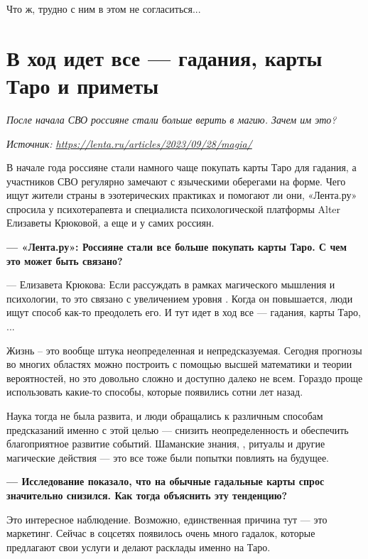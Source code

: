Что ж, трудно с ним в этом не согласиться...

\newpage
\section{В ход идет все — гадания, карты Таро и приметы}

\textit{После начала СВО россияне стали больше верить в магию. Зачем им это?}

\textit{Источник: \url{https://lenta.ru/articles/2023/09/28/magia/}}

В начале года россияне стали намного чаще покупать карты Таро для гадания, а участников СВО регулярно замечают с языческими оберегами на форме. Чего ищут жители страны в эзотерических практиках и помогают ли они, «Лента.ру» спросила у психотерапевта и специалиста психологической платформы Alter Елизаветы Крюковой, а еще и у самих россиян.

\textbf{--- «Лента.ру»: Россияне стали все больше покупать карты Таро. С чем это может быть связано?}

--- Елизавета Крюкова: Если рассуждать в рамках магического мышления и психологии, то это связано с увеличением уровня . Когда он повышается, люди ищут способ как-то преодолеть его. И тут идет в ход все — гадания, карты Таро, ...

Жизнь -- это вообще штука неопределенная и непредсказуемая. Сегодня прогнозы во многих областях можно построить с помощью высшей математики и теории вероятностей, но это довольно сложно и доступно далеко не всем. Гораздо проще использовать какие-то  способы, которые появились сотни лет назад.

Наука тогда не была развита, и люди обращались к различным способам предсказаний именно с этой целью — снизить неопределенность и обеспечить благоприятное развитие событий. Шаманские знания, , ритуалы и другие магические действия --- это все тоже были попытки повлиять на будущее.

\textbf{--- Исследование показало, что на обычные гадальные карты спрос значительно снизился. Как тогда объяснить эту тенденцию?}

Это интересное наблюдение. Возможно, единственная причина тут — это маркетинг. Сейчас в соцсетях появилось очень много гадалок, которые предлагают свои услуги и делают расклады именно на Таро.


